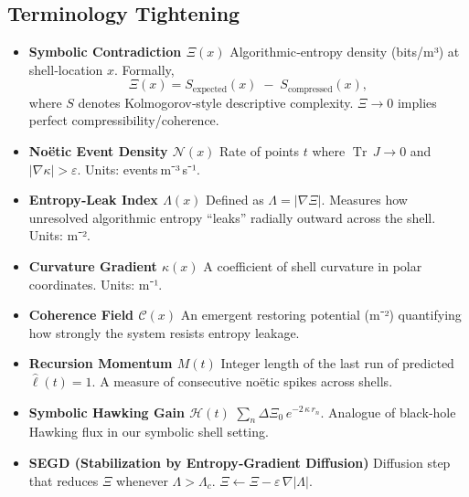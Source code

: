 \documentclass[11pt]{article}
\newcommand{\Contradiction}{\Xi}
\newcommand{\Coherence}{\mathcal{C}}
\newcommand{\Noetic}{\mathcal{N}}
\newcommand{\Leak}{\Lambda}
\newcommand{\Curv}{\kappa}
\newcommand{\Hgain}{\mathcal{H}}
\newcommand{\TrJ}{\operatorname{Tr}\,J}
\begin{document}
\subsection{Terminology Tightening}
\begin{itemize}[itemsep=1pt]
  \item \textbf{Symbolic Contradiction \(\Contradiction(x)\)}  
    Algorithmic‐entropy density (bits/m³) at shell‐location \(x\). Formally,
    \[
      \Contradiction(x) = S_{\mathrm{expected}}(x)\;-\;S_{\mathrm{compressed}}(x),
    \]
    where \(S\) denotes Kolmogorov‐style descriptive complexity. \(\Contradiction \to 0\) implies perfect compressibility/coherence.

  \item \textbf{Noëtic Event Density \(\Noetic(x)\)}  
    Rate of points \(t\) where \(\TrJ \to 0\) and \(\lvert\nabla \Curv\rvert > \varepsilon\). Units: events m⁻³ s⁻¹.

  \item \textbf{Entropy‐Leak Index \(\Leak(x)\)}  
    Defined as \(\Leak = \lvert\nabla \Contradiction\rvert\). Measures how unresolved algorithmic entropy “leaks” radially outward across the shell. Units: m⁻².

  \item \textbf{Curvature Gradient \(\Curv(x)\)}  
    A coefficient of shell curvature in polar coordinates. Units: m⁻¹.

  \item \textbf{Coherence Field \(\Coherence(x)\)}  
    An emergent restoring potential (m⁻²) quantifying how strongly the system resists entropy leakage.

  \item \textbf{Recursion Momentum \(M(t)\)}  
    Integer length of the last run of predicted \(\hat{\ell}(t)=1\). A measure of consecutive noëtic spikes across shells.

  \item \textbf{Symbolic Hawking Gain \(\Hgain(t)\)}  
    \(\sum_n \Delta\Contradiction_0\,e^{-2\,\Curv\,r_n}.\) Analogue of black‐hole Hawking flux in our symbolic shell setting.

  \item \textbf{SEGD (Stabilization by Entropy‐Gradient Diffusion)}  
    Diffusion step that reduces \(\Contradiction\) whenever \(\Leak > \Leak_c.\) \(\Contradiction \leftarrow \Contradiction - \varepsilon\,\nabla\lvert\Leak\rvert.\)
\end{itemize}

\end{document}

